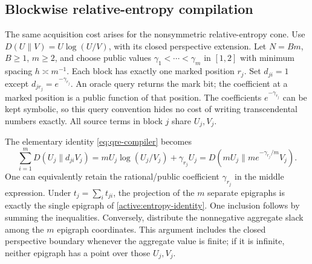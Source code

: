 \subsection{Blockwise relative-entropy compilation}

The same acquisition cost arises for the nonsymmetric relative-entropy
cone.
Use $D(U\|V)=U\log(U/V)$, with its closed perspective extension.
Let $N=Bm$, $B\geq1$, $m\geq2$, and choose public values
$\gamma_1<\cdots<\gamma_m$ in $[1,2]$ with minimum spacing
$h\asymp m^{-1}$. Each block has exactly one marked position
$r_j$. Set $d_{ji}=1$ except $d_{j r_j}=e^{-\gamma_{r_j}}$.
An oracle query returns the mark bit; the coefficient at a marked
position is a public function of that position. The coefficients
$e^{-\gamma_{r_j}}$ can be kept symbolic, so this query convention
hides no cost of writing transcendental numbers exactly. All source
terms in block $j$ share $U_j,V_j$.

The elementary identity \eqref{eq:qre-compiler} becomes
\begin{equation}\label{active:entropy-identity}
 \sum_{i=1}^m D(U_j\|d_{ji}V_j)
 =mU_j\log(U_j/V_j)+\gamma_{r_j}U_j
 =D(mU_j\|m e^{-\gamma_{r_j}/m}V_j).
\end{equation}
One can equivalently retain the rational/public coefficient
$\gamma_{r_j}$ in the middle expression. Under $t_j=\sum_i t_{ji}$,
the projection of the $m$ separate epigraphs is exactly the
single epigraph of \eqref{active:entropy-identity}. One inclusion
follows by summing the inequalities. Conversely, distribute the
nonnegative aggregate slack among the $m$ epigraph coordinates.
This argument includes the closed perspective boundary whenever
the aggregate value is finite; if it is infinite, neither epigraph
has a point over those $U_j,V_j$.

